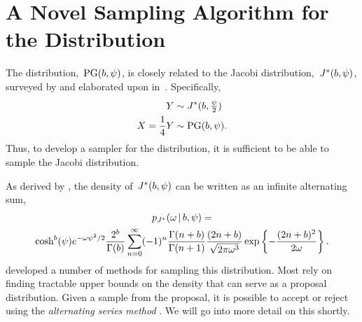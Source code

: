 \section{A Novel Sampling Algorithm for the \polyagamma Distribution}
\label{sec:pgsampling}

The \polyagamma distribution,~$\mathrm{PG}(b,\psi)$, is closely related 
to the Jacobi distribution,~$J^{*}(b,\psi)$, surveyed by \citet{biane2001probability} and 
elaborated upon in~\citet{windle2014sampling}.
Specifically, 
\begin{align*}
  Y &\sim J^{*}(b, \tfrac{\psi}{2}) \\
  X = \frac{1}{4} Y &\sim \mathrm{PG}(b, \psi).
\end{align*}
Thus, to develop a sampler for the \polyagamma distribution, 
it is sufficient to be able to sample the Jacobi distribution.

As derived by \citet{windle2014sampling}, the density
of~$J^{*}(b,\psi)$ can be written as an infinite alternating
sum,
\begin{multline}
  \label{eq:jacobi_density}
  p_{J^{*}}({\omega} \,|\, b, \psi) = \\ 
  \cosh^b(\psi) e^{-{\omega} \psi^2/2} \frac{2^b}{\Gamma(b)} 
  \sum_{n=0}^\infty (-1)^n \frac{\Gamma(n+b)}{\Gamma(n+1)} \frac{(2n+b)}{\sqrt{2\pi {\omega}^3}}
  \exp\left\{- \frac{(2n+b)^2}{2{\omega}} \right\}.
\end{multline}
\citet{windle2014sampling} developed a number of methods for sampling
this distribution. Most rely on finding tractable upper bounds on the density
that can serve as a proposal distribution. Given a sample from the proposal,
it is possible to accept or reject using the \emph{alternating series method} \citep{devroye1986}. We will go into more detail on this shortly.

